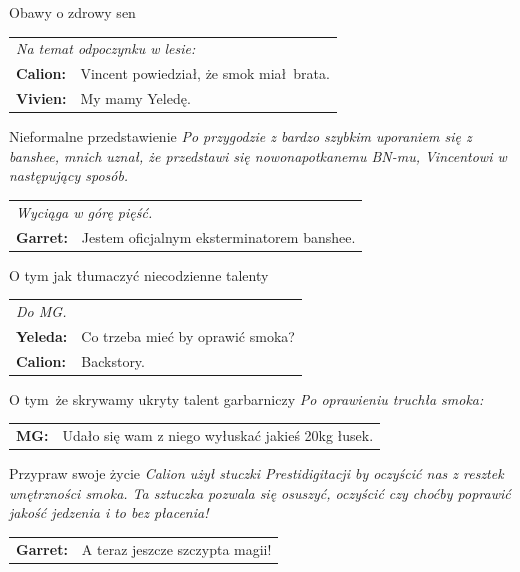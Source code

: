 \documentclass[10pt,twoside,twocolumn]{book}
\begin{document}
\begin{rpg-quotebox}{Obawy o zdrowy sen}
   \begin{tabularx}{\columnwidth}{lX}
      \multicolumn{2}{l}{\textit{Na temat odpoczynku w lesie:}} \\
      \textbf{Calion:} & Vincent powiedział, że smok miał brata.\\
      \textbf{Vivien:} & My mamy Yeledę.
   \end{tabularx}
\end{rpg-quotebox}


\begin{rpg-quotebox}{Nieformalne przedstawienie}
   \textit{Po przygodzie z bardzo szybkim uporaniem się z banshee, mnich uznał, że przedstawi się nowonapotkanemu BN-mu, Vincentowi w następujący sposób.}\\

   \begin{tabularx}{\columnwidth}{lX}
      \multicolumn{2}{l}{\textit{Wyciąga w górę pięść.}}\\
      \textbf{Garret:} & Jestem oficjalnym eksterminatorem banshee. \\
   \end{tabularx}
\end{rpg-quotebox}


\begin{rpg-quotebox}{O tym jak tłumaczyć niecodzienne talenty}
   \begin{tabularx}{\columnwidth}{lX}
      \multicolumn{2}{l}{\textit{Do MG.}}\\
      \textbf{Yeleda:} & Co trzeba mieć by oprawić smoka?\\
      \textbf{Calion:} & Backstory.
   \end{tabularx}
\end{rpg-quotebox}


\begin{rpg-quotebox}{O tym\, że skrywamy ukryty talent garbarniczy}
   \textit{Po oprawieniu truchła smoka:}\\
   
   \begin{tabularx}{\columnwidth}{lX}
      \textbf{MG:} & Udało się wam z niego wyłuskać jakieś 20kg łusek.\\
   \end{tabularx}
\end{rpg-quotebox}


\begin{rpg-quotebox}{Przypraw swoje życie}
   \textit{Calion użył stuczki Prestidigitacji by oczyścić nas z resztek wnętrzności smoka. Ta sztuczka pozwala się osuszyć, oczyścić czy choćby poprawić jakość jedzenia i to bez płacenia!}\\ 
   
   \begin{tabularx}{\columnwidth}{lX}
      \textbf{Garret:} & A teraz jeszcze szczypta magii!\\
   \end{tabularx}
\end{rpg-quotebox}
\end{document}
